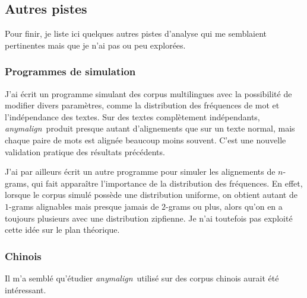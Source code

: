 \documentclass[a4paper,10pt]{article}
\newcommand{\anym}{\emph{anymalign}}
\begin{document}



\subsection{Autres pistes}

Pour finir, je liste ici quelques autres pistes d'analyse qui me semblaient pertinentes mais que je n'ai pas ou peu explorées.

\subsubsection{Programmes de simulation}

J'ai écrit un programme simulant des corpus multilingues avec la possibilité de modifier divers paramètres, comme la distribution des fréquences de mot et l'indépendance des textes. Sur des textes complètement indépendants, \anym~produit presque autant d'alignements que sur un texte normal, mais chaque paire de mots est alignée beaucoup moins souvent. C'est une nouvelle validation pratique des résultats précédents.

J'ai par ailleurs écrit un autre programme pour simuler les alignements de $n$-grams, qui fait apparaître l'importance de la distribution des fréquences. En effet, lorsque le corpus simulé possède une distribution uniforme, on obtient autant de $1$-grams alignables mais presque jamais de $2$-grams ou plus, alors qu'on en a toujours plusieurs avec une distribution zipfienne. Je n'ai toutefois pas exploité cette idée sur le plan théorique.

\subsubsection{Chinois}

Il m'a semblé qu'étudier \anym~utilisé sur des corpus chinois aurait été intéressant.
\end{document}
